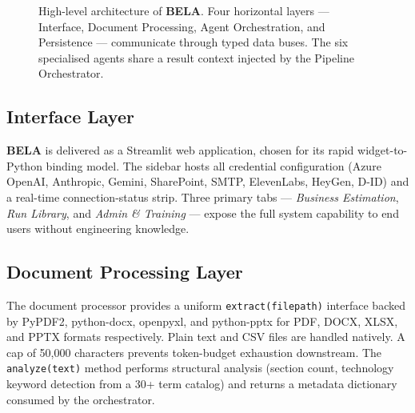 \documentclass[10pt,twocolumn]{article}
\newcommand{\bela}{\textbf{BELA}}
\newcommand{\code}[1]{\texttt{\small #1}}
\begin{document}
\begin{figure}[H]
\caption{High-level architecture of \bela{}. Four horizontal layers —
Interface, Document Processing, Agent Orchestration, and Persistence —
communicate through typed data buses. The six specialised agents share a
result context injected by the Pipeline Orchestrator.}
\label{fig:overview}
\end{figure}

\subsection{Interface Layer}

\bela{} is delivered as a Streamlit web application, chosen for its rapid
widget-to-Python binding model. The sidebar hosts all credential configuration
(Azure OpenAI, Anthropic, Gemini, SharePoint, SMTP, ElevenLabs, HeyGen, D-ID)
and a real-time connection-status strip. Three primary tabs —
\textit{Business Estimation}, \textit{Run Library}, and \textit{Admin \& Training}
— expose the full system capability to end users without engineering knowledge.

\subsection{Document Processing Layer}

The document processor provides a uniform \code{extract(filepath)} interface
backed by PyPDF2, python-docx, openpyxl, and python-pptx for PDF, DOCX, XLSX,
and PPTX formats respectively. Plain text and CSV files are handled natively.
A cap of 50,000 characters prevents token-budget exhaustion downstream.
The \code{analyze(text)} method performs structural analysis (section count,
technology keyword detection from a 30+ term catalog) and returns a
metadata dictionary consumed by the orchestrator.
\end{document}
